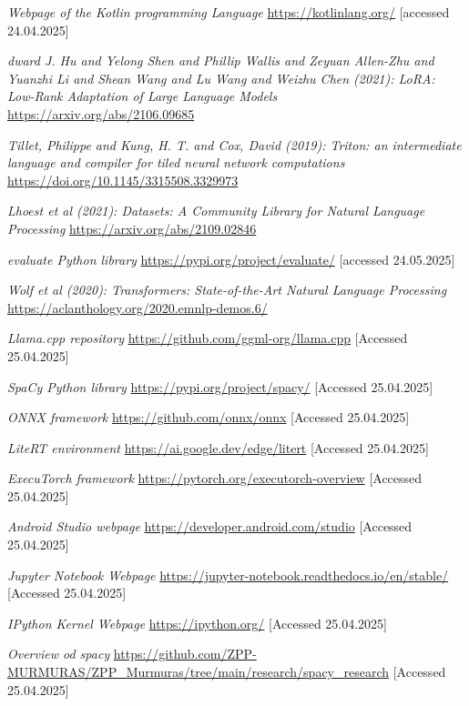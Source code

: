 \documentclass[licencjacka,en]{pracamgr}
\begin{document}
\textit{Webpage of the Kotlin programming Language}
\url{https://kotlinlang.org/}
[accessed 24.04.2025]

\textit{dward J. Hu and Yelong Shen and Phillip Wallis and Zeyuan Allen-Zhu and Yuanzhi Li and Shean Wang and Lu Wang and Weizhu Chen (2021): LoRA: Low-Rank Adaptation of Large Language Models}
\url{https://arxiv.org/abs/2106.09685}

\textit{Tillet, Philippe and Kung, H. T. and Cox, David (2019): Triton: an intermediate language and compiler for tiled neural network computations}
\url{https://doi.org/10.1145/3315508.3329973}

\textit{Lhoest et al (2021): Datasets: A Community Library for Natural Language Processing}
\url{https://arxiv.org/abs/2109.02846}

\textit{evaluate Python library}
\url{https://pypi.org/project/evaluate/}
[accessed 24.05.2025]

\textit{Wolf et al (2020): Transformers: State-of-the-Art Natural Language Processing}
\url{https://aclanthology.org/2020.emnlp-demos.6/}

\textit{Llama.cpp repository}
\url{https://github.com/ggml-org/llama.cpp}
[Accessed 25.04.2025]

\textit{SpaCy Python library}
\url{https://pypi.org/project/spacy/}
[Accessed 25.04.2025]

\textit{ONNX framework}
\url{https://github.com/onnx/onnx}
[Accessed 25.04.2025]

\textit{LiteRT environment}
\url{https://ai.google.dev/edge/litert}
[Accessed 25.04.2025]

\textit{ExecuTorch framework}
\url{https://pytorch.org/executorch-overview}
[Accessed 25.04.2025]

\textit{Android Studio webpage}
\url{https://developer.android.com/studio}
[Accessed 25.04.2025]

\textit{Jupyter Notebook Webpage}
\url{https://jupyter-notebook.readthedocs.io/en/stable/}
[Accessed 25.04.2025]

\textit{IPython Kernel Webpage}
\url{https://ipython.org/}
[Accessed 25.04.2025]

\textit{Overview od spacy}
\url{https://github.com/ZPP-MURMURAS/ZPP_Murmuras/tree/main/research/spacy_research}
[Accessed 25.04.2025]
\end{document}

